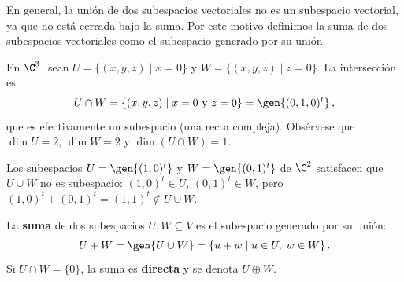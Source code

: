En general, la unión de dos subespacios vectoriales no es un subespacio vectorial, ya que no está cerrada bajo la suma. Por este motivo definimos la suma de dos subespacios vectoriales como el subespacio generado por su unión.

\begin{eje}
  En $\C^3$, sean $U = \{(x,y,z)\mid x=0\}$ y $W = \{(x,y,z)\mid z=0\}$. La intersección es
  \[
    U\cap W = \{(x,y,z)\mid x=0\text{ y }z=0\} = \gen{(0,1,0)^t}\,,
  \]
  que es efectivamente un subespacio (una recta compleja). Obsérvese que $\dim U = 2$, $\dim W = 2$ y $\dim(U\cap W)=1$.
\end{eje}

\begin{eje}
  Los subespacios $U=\gen{(1,0)^t}$ y $W=\gen{(0,1)^t}$ de $\C^2$ satisfacen que $U\cup W$ no es subespacio: $(1,0)^t\in U$, $(0,1)^t\in W$, pero $(1,0)^t+(0,1)^t=(1,1)^t\notin U\cup W$.
\end{eje}

\begin{defi}
  La \textbf{suma} de dos subespacios $U,W\subseteq V$ es el subespacio generado por su unión:
  \[
    U + W = \gen{U\cup W} = \{u+w \mid u\in U,\; w\in W\}\,.
  \]
  Si $U\cap W = \{0\}$, la suma es \textbf{directa} y se denota $U\oplus W$.
\end{defi}

